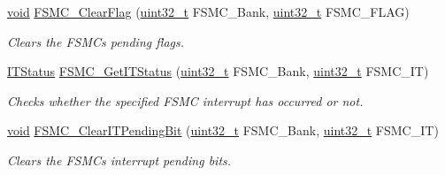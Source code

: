 \begin{DoxyCompactItemize}
\hyperlink{usb__devapi_8h_afabf60e7f57651d6d595a02c75f07cd0}{void} \hyperlink{group___f_s_m_c___private___functions_ga697618f2de0ad9a8a82461ddbebd5264}{F\+S\+M\+C\+\_\+\+Clear\+Flag} (\hyperlink{_p_e___types_8h_a33594304e786b158f3fb30289278f5af}{uint32\+\_\+t} F\+S\+M\+C\+\_\+\+Bank, \hyperlink{_p_e___types_8h_a33594304e786b158f3fb30289278f5af}{uint32\+\_\+t} F\+S\+M\+C\+\_\+\+F\+L\+AG)
\begin{DoxyCompactList}\small\item\em Clears the F\+S\+MC\textquotesingle{}s pending flags. \end{DoxyCompactList}\item 
\hyperlink{agilefox_2library_2inc_2stm32f10x__type_8h_aacbd7ed539db0aacd973a0f6eca34074}{I\+T\+Status} \hyperlink{group___f_s_m_c___private___functions_ga7fce9ca889d33cd8b8b7413875dd4d73}{F\+S\+M\+C\+\_\+\+Get\+I\+T\+Status} (\hyperlink{_p_e___types_8h_a33594304e786b158f3fb30289278f5af}{uint32\+\_\+t} F\+S\+M\+C\+\_\+\+Bank, \hyperlink{_p_e___types_8h_a33594304e786b158f3fb30289278f5af}{uint32\+\_\+t} F\+S\+M\+C\+\_\+\+IT)
\begin{DoxyCompactList}\small\item\em Checks whether the specified F\+S\+MC interrupt has occurred or not. \end{DoxyCompactList}\item 
\hyperlink{usb__devapi_8h_afabf60e7f57651d6d595a02c75f07cd0}{void} \hyperlink{group___f_s_m_c___private___functions_gad9387e7674b8a376256a3378649e004e}{F\+S\+M\+C\+\_\+\+Clear\+I\+T\+Pending\+Bit} (\hyperlink{_p_e___types_8h_a33594304e786b158f3fb30289278f5af}{uint32\+\_\+t} F\+S\+M\+C\+\_\+\+Bank, \hyperlink{_p_e___types_8h_a33594304e786b158f3fb30289278f5af}{uint32\+\_\+t} F\+S\+M\+C\+\_\+\+IT)
\begin{DoxyCompactList}\small\item\em Clears the F\+S\+MC\textquotesingle{}s interrupt pending bits. \end{DoxyCompactList}\end{DoxyCompactItemize}
